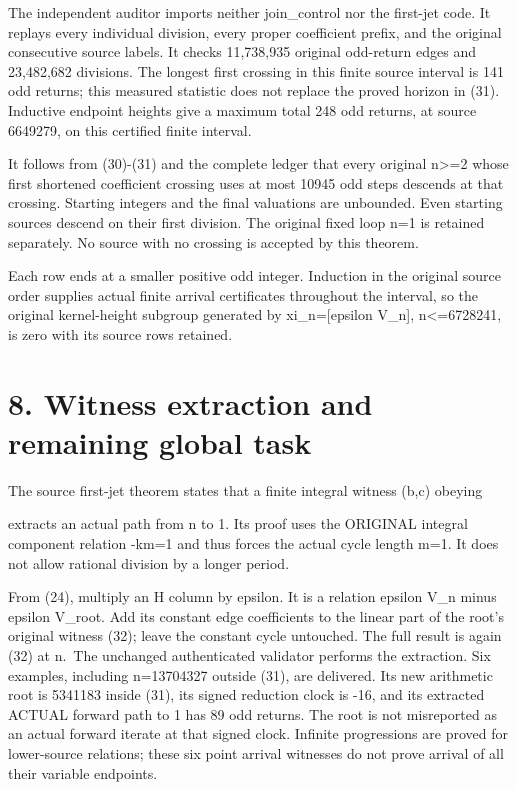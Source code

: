 The independent auditor imports neither join\_control nor the first-jet
code. It replays every individual division, every proper coefficient
prefix, and the original consecutive source labels. It checks 11,738,935
original odd-return edges and 23,482,682 divisions. The longest first
crossing in this finite source interval is 141 odd returns; this
measured statistic does not replace the proved horizon in (31).
Inductive endpoint heights give a maximum total 248 odd returns, at
source 6649279, on this certified finite interval.

It follows from (30)-(31) and the complete ledger that every original
n\textgreater=2 whose first shortened coefficient crossing uses at most
10945 odd steps descends at that crossing. Starting integers and the
final valuations are unbounded. Even starting sources descend on their
first division. The original fixed loop n=1 is retained separately. No
source with no crossing is accepted by this theorem.

Each row ends at a smaller positive odd integer. Induction in the
original source order supplies actual finite arrival certificates
throughout the interval, so the original kernel-height subgroup
generated by xi\_n={[}epsilon V\_n{]}, n\textless=6728241, is zero with
its source rows retained.

\section{8. Witness extraction and remaining global task}

The source first-jet theorem states that a finite integral witness (b,c)
obeying


extracts an actual path from n to 1. Its proof uses the ORIGINAL
integral component relation -km=1 and thus forces the actual cycle
length m=1. It does not allow rational division by a longer period.

From (24), multiply an H column by epsilon. It is a relation epsilon
V\_n minus epsilon V\_root. Add its constant edge coefficients to the
linear part of the root's original witness (32); leave the constant
cycle untouched. The full result is again (32) at n.~The unchanged
authenticated validator performs the extraction. Six examples, including
n=13704327 outside (31), are delivered. Its new arithmetic root is
5341183 inside (31), its signed reduction clock is -16, and its
extracted ACTUAL forward path to 1 has 89 odd returns. The root is not
misreported as an actual forward iterate at that signed clock. Infinite
progressions are proved for lower-source relations; these six point
arrival witnesses do not prove arrival of all their variable endpoints.

